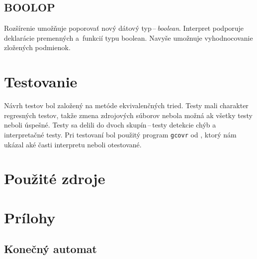 \documentclass[11pt,a4paper]{article}
\begin{document}
	\subsection{BOOLOP}
	Rozšírenie umožňuje poporovať nový dátový typ\,--\,\emph{boolean}. Interpret
	podporuje deklarácie premenných a~funkcií typu boolean. Navyše
	umožnuje vyhodnocovanie zložených podmienok.

	\section{Testovanie}
	\label{testovanie}
	Návrh testov bol založený na metóde ekvivalenčných tried. Testy mali charakter
	regresných testov, takže zmena zdrojových súborov nebola možná ak
	všetky testy neboli úspešné. Testy sa delili do dvoch skupín\,--\,testy
	detekcie chýb a interpretačné testy. Pri testovaní bol použitý program
	\texttt{gcovr} od \cite{COV}, ktorý nám ukázal aké časti interpretu neboli otestované.
    \newpage
	\section{Použité zdroje}
	{}
	

	\newpage
	\section{Prílohy}


	\subsection{Konečný automat}
	\label{app:automat}


	\newpage
\end{document}
